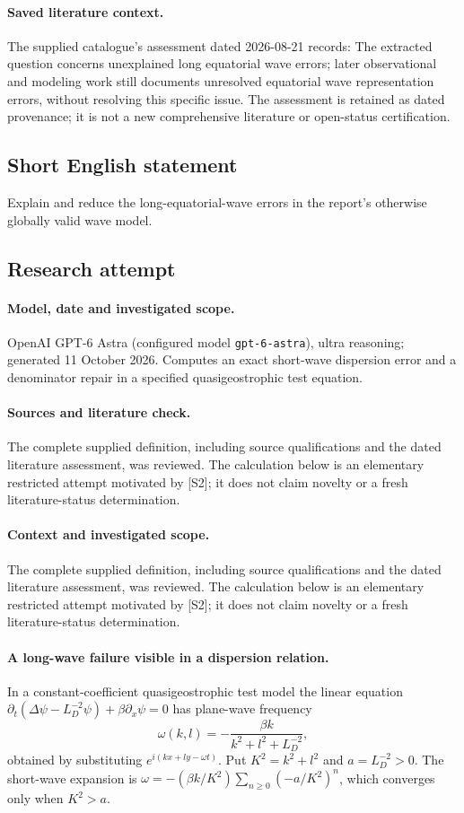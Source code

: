 \documentclass[11pt]{article}
\begin{document}
\paragraph{Saved literature context.} The supplied catalogue's assessment dated 2026-08-21 records: The extracted question concerns unexplained long equatorial wave errors; later observational and modeling work still documents unresolved equatorial wave representation errors, without resolving this specific issue. The assessment is retained as dated provenance; it is not a new comprehensive literature or open-status certification.
\subsection{Short English statement}
Explain and reduce the long-equatorial-wave errors in the report's otherwise globally valid wave model.
\subsection{Research attempt}
\paragraph{Model, date and investigated scope.}
OpenAI GPT-6 Astra (configured model \texttt{gpt-6-astra}), ultra reasoning; generated 11 October 2026. Computes an exact short-wave dispersion error and a denominator repair in a specified quasigeostrophic test equation.

\paragraph{Sources and literature check.}
The complete supplied definition, including source qualifications and the dated literature assessment, was reviewed. The calculation below is an elementary restricted attempt motivated by [S2]; it does not claim novelty or a fresh literature-status determination.

\paragraph{Context and investigated scope.} The complete supplied definition, including source qualifications and the dated literature assessment, was reviewed. The calculation below is an elementary restricted attempt motivated by [S2]; it does not claim novelty or a fresh literature-status determination.

\paragraph{A long-wave failure visible in a dispersion relation.} In a constant-coefficient quasigeostrophic test model the linear equation $\partial_t(\Delta\psi-L_D^{-2}\psi)+\beta\partial_x\psi=0$ has plane-wave frequency
\[
 \omega(k,l)=-\frac{\beta k}{k^2+l^2+L_D^{-2}},
\]
obtained by substituting $e^{i(kx+ly-\omega t)}$. Put $K^2=k^2+l^2$ and $a=L_D^{-2}>0$. The short-wave expansion is $\omega=-(\beta k/K^2)\sum_{n\geq0}(-a/K^2)^n$, which converges only when $K^2>a$.
\end{document}

